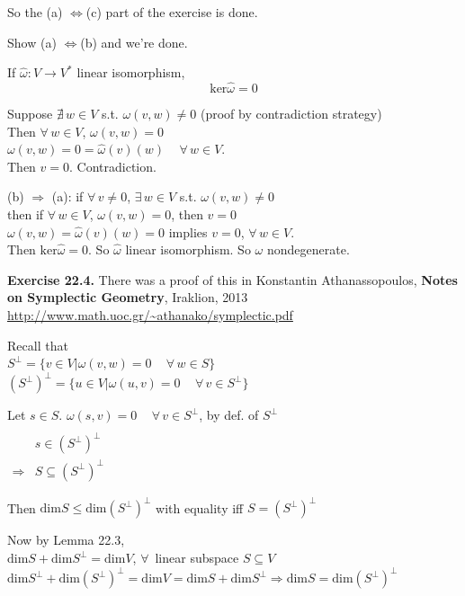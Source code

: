 \documentclass[11pt]{amsart}
\theoremstyle{definition}
\newcommand{\exercisehead}[1]{\medskip\noindent\textbf{Exercise #1.} }
\begin{document}
So the (a) $\Longleftrightarrow$(c) part of the exercise is done.

Show (a) $\Longleftrightarrow$(b) and we're done.

If $\widehat{\omega}:V\to V^*$ linear isomorphism,
\[
\text{ker}\widehat{\omega}=0
\]

Suppose $\nexists \, w \in V$ s.t. $\omega(v,w)\neq 0$ (proof by contradiction strategy) \\
Then $\forall \, w \in V$, $\omega(v,w) =0$  \\
$\omega(v,w) = 0 = \widehat{\omega}(v)(w) \quad \, \forall \, w \in V$.  \\
Then $v=0$.  Contradiction.

(b) $\Longrightarrow $ (a): if $\forall \, v \neq 0$, $\exists \, w \in V$ s.t. $\omega(v,w) \neq 0$ \\
then if $\forall \, w \in V$, $\omega(v,w) =0$, then $v=0$ \\
$\omega(v,w) = \widehat{\omega}(v)(w) = 0$ implies $v=0$, $\forall \, w \in V$.  \\
Then $\text{ker}\widehat{\omega}=0$.  So $\widehat{\omega}$ linear isomorphism.  So $\omega$ nondegenerate.

\exercisehead{22.4} There was a proof of this in Konstantin Athanassopoulos, \textbf{Notes on Symplectic Geometry}, Iraklion, 2013
\url{http://www.math.uoc.gr/~athanako/symplectic.pdf}

Recall that \\
$S^{\perp} = \lbrace v \in V | \omega(v,w) =0 \quad \, \forall \, w \in S \rbrace$ \\
$(S^{\perp})^{\perp} = \lbrace u \in V | \omega(u,v)=0 \quad \, \forall \, v \in S^{\perp}\rbrace$

Let $s\in S$.  $\omega(s,v)=0 \quad \, \forall \, v \in S^{\perp}$, by def. of $S^{\perp}$ \\
$\begin{aligned} & \quad \\
  & s\in (S^{\perp})^{\perp} \\
  \Longrightarrow & S \subseteq (S^{\perp})^{\perp} \end{aligned}$

Then $\text{dim}S \leq \text{dim}(S^{\perp})^{\perp}$ with equality iff $S= (S^{\perp})^{\perp}$

Now by Lemma 22.3, \\
$\text{dim}S + \text{dim}S^{\perp} = \text{dim}V$, $\forall \, $ linear subspace $S\subseteq V$ \\
$\text{dim}S^{\perp} + \text{dim}(S^{\perp})^{\perp} = \text{dim}V = \text{dim}S + \text{dim}S^{\perp} \Longrightarrow \text{dim}S = \text{dim}(S^{\perp})^{\perp}$ \\
\end{document}
